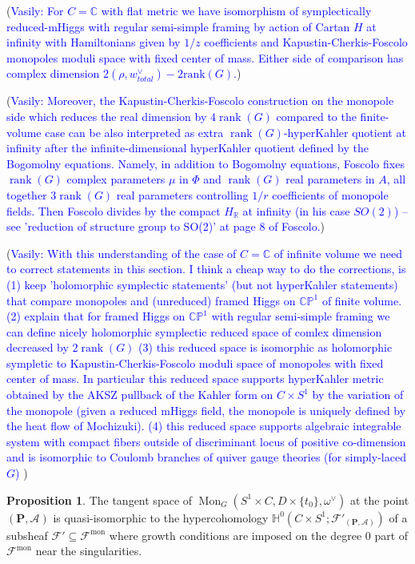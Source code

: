 \documentclass[11pt, oneside, reqno]{amsart}
\theoremstyle{definition} \newtheorem{definition}{Definition}[section]
\newtheorem{prop}[definition]{Proposition}
\theoremstyle{definition} \newtheorem{remark}[definition]{Remark}
\theoremstyle{definition} \newtheorem{remarks}[definition]{Remarks}
\theoremstyle{definition} \newtheorem{question}[definition]{Question}
\theoremstyle{definition} \newtheorem*{note}{Note}
\theoremstyle{definition} \newtheorem{example}[definition]{Example}
\theoremstyle{definition} \newtheorem{examples}[definition]{Examples}
\newcommand{\bb}[1]{\mathbb{#1}}
\newcommand{\mr}[1]{\mathrm{#1}}
\newcommand{\mc}[1]{\mathcal{#1}}
\newcommand{\bo}[1]{\boldsymbol{#1}}
\newcommand{\sub}{\subseteq}
\DeclareMathOperator{\rank}{rank}
\DeclareMathOperator{\mon}{Mon}
\newcommand{\vasily}[1]{(\textcolor{blue}{Vasily: #1})}
\begin{document}
\vasily{ For $C = \mathbb{C}$ with flat metric we have isomorphism of
  symplectically reduced-mHiggs with regular semi-simple framing by
  action of Cartan $H$ at infinity with Hamiltonians given by $1/z$
  coefficients and Kapustin-Cherkis-Foscolo monopoles moduli space
  with fixed center of mass. Either
  side of comparison has complex dimension $2(\rho, w_{total}^{\vee}) - 2 \mathrm{rank}(G)$.}

\vasily{  Moreover, the Kapustin-Cherkis-Foscolo construction
  on the monopole side which reduces the real dimension
  by $4 \rank(G)$ compared to the finite-volume case
  can be also interpreted as extra $\rank(G)$-hyperKahler quotient
  at infinity after the infinite-dimensional hyperKahler quotient defined
  by the Bogomolny equations. 
  Namely, in addition to Bogomolny equations, Foscolo fixes $\rank(G)$ complex parameters $\mu$ in $\Phi$
  and $\rank(G)$ real parameters in $A$, all together $3 \rank(G)$
  real parameters controlling $1/r$ coefficients of monopole fields.
  Then Foscolo divides by the compact $H_{\mathbb{R}}$ at infinity (in his
  case $SO(2)$)  -- see 'reduction of structure group to SO(2)' at page 8 of Foscolo.}

\vasily{With this understanding of the case of $C = \mathbb{C}$ of infinite volume
  we need to correct statements in this section.
  I think a cheap way to do the corrections, is (1) keep 'holomorphic
  symplectic statements' (but not hyperKahler statements) 
  that compare monopoles and (unreduced) framed Higgs on $\mathbb{CP}^1$
  of finite volume. (2) explain that for framed Higgs on $\mathbb{CP}^1$
  with regular semi-simple framing
  we can define nicely holomorphic symplectic reduced space
  of comlex dimension decreased by $2 \rank(G)$
  (3) this reduced space is isomorphic as holomorphic sympletic
  to Kapustin-Cherkis-Foscolo moduli space of monopoles
  with fixed center of mass. In particular this reduced
  space supports hyperKahler metric obtained by
  the AKSZ pullback of the Kahler form on $C \times S^1$
  by the variation of the monopole (given
  a reduced mHiggs field,  the monopole is uniquely defined
   by the heat flow of Mochizuki). 
  (4) this reduced space supports algebraic integrable system with
  compact fibers outside of discriminant locus of positive co-dimension
  and is isomorphic to Coulomb branches of quiver gauge theories
  (for simply-laced $G$)
 }

  



 
\begin{prop}
The tangent space of $\mon_G(S^1 \times C, D \times \{t_0\}, \omega^\vee)$ at the point $(\bo P,\mc A)$ is quasi-isomorphic to the hypercohomology $\bb H^0(C \times S^1; \mc F'_{(\bo P,\mc A)})$ of a subsheaf $\mc F' \sub \mc F^{\mr{mon}}$ where growth conditions are imposed on the degree 0 part of $\mc F^{\mr{mon}}$ near the singularities.
\end{prop}
\end{document}
